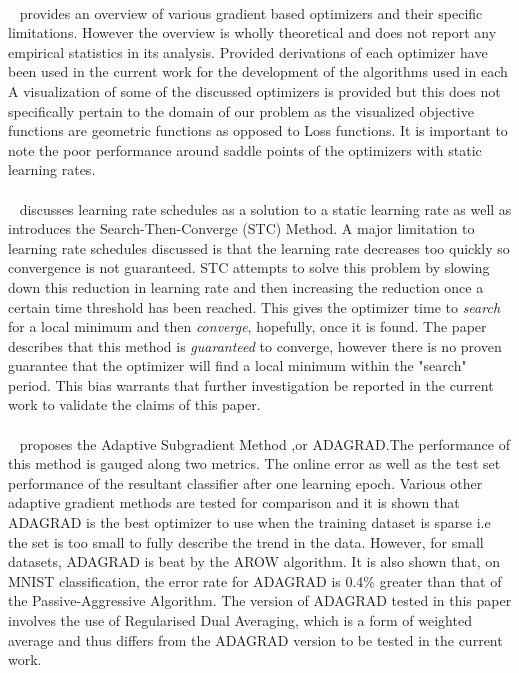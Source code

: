 \documentclass{article}
\begin{document}
 \paragraph{}~\citet{ruder2016overview} provides an overview of various gradient based optimizers and their specific limitations. However the overview is wholly theoretical and does not report any empirical statistics in its analysis.
 Provided derivations of each optimizer have been used in the current work for the development of the algorithms used in each  A visualization of some of the discussed optimizers is provided but this does not specifically pertain to the domain of our problem as the visualized objective functions are geometric functions as opposed to Loss functions. It is important to note the poor performance around saddle points of the optimizers with static learning rates.
 
 
 \paragraph{}~\citet{darken1991note} discusses learning rate schedules as a solution to a static learning rate as well as introduces the Search-Then-Converge (STC) Method. A major limitation to learning rate schedules discussed is that the learning rate decreases too quickly so convergence is not guaranteed. STC attempts to solve this problem by slowing down this reduction in learning rate and then increasing the reduction once a certain time threshold has been reached. This gives the optimizer time to \textit{search} for a local minimum and then \textit{converge}, hopefully, once it is found. The paper describes that this method is \textit{guaranteed} to converge, however there is no proven guarantee that the optimizer will find a local minimum within the "search" period. This bias warrants that further investigation be reported in the current work to validate the claims of this paper.
 
 \paragraph{}~\citet{duchi2011adaptive} proposes the Adaptive Subgradient Method ,or ADAGRAD.The performance of this method is gauged along two metrics. The online error as well as the test set performance of the resultant classifier after one learning epoch. Various other adaptive gradient methods are tested for comparison and it is shown that ADAGRAD is the best optimizer to use when the training dataset is sparse i.e the set is too small to fully describe the trend in the data. However, for small datasets, ADAGRAD is beat by the AROW algorithm. It is also shown that, on MNIST classification, the error rate for ADAGRAD is 0.4\% greater than that of the Passive-Aggressive Algorithm. The version of ADAGRAD tested in this paper involves the use of Regularised Dual Averaging, which is a form of weighted average and thus differs from the ADAGRAD version to be tested in the current work.
 
\end{document}
